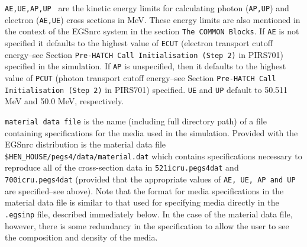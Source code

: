 \documentclass[12pt,twoside]{article}
\begin{document}
\begin{description}
\item {\tt AE,UE,AP,UP } are the kinetic energy limits for calculating photon ({\tt AP,UP}) and electron ({\tt AE,UE}) cross sections in
MeV.  These energy limits are also mentioned in the context of the EGSnrc system in the section {\tt The COMMON Blocks}.
If {\tt AE} is
not specified it defaults to the highest value of {\tt ECUT} (electron transport cutoff energy--see Section {\tt Pre-HATCH Call Initialisation (Step 2)} in PIRS701) specified
in the simulation.  If
{\tt AP} is unspecified, then it defaults to the highest value of {\tt PCUT} (photon transport cutoff energy--see Section {\tt Pre-HATCH Call Initialisation (Step 2)} in PIRS701)
specified.  {\tt UE} and {\tt UP} default to 50.511 MeV and 50.0 MeV, respectively.

\item {\tt material data file} is the name (including full directory path) of a file containing specifications for the media used
in the simulation.  Provided with the EGSnrc distribution is the material data file {\tt \$HEN\_HOUSE/pegs4/data/material.dat} which
contains specifications necessary to reproduce all of the cross-section data in {\tt 521icru.pegs4dat} and {\tt 700icru.pegs4dat}
(provided that the appropriate values of {\tt AE, UE, AP and UP} are specified--see above).  Note that the format for
media specifications in the material data file is similar to that used for specifying media directly in the
{\tt .egsinp} file, described immediately below.  In the case of the material data file, however, there is some redundancy in the specification to allow the
user to see the composition and density of the media.


\end{description}
\end{document}
